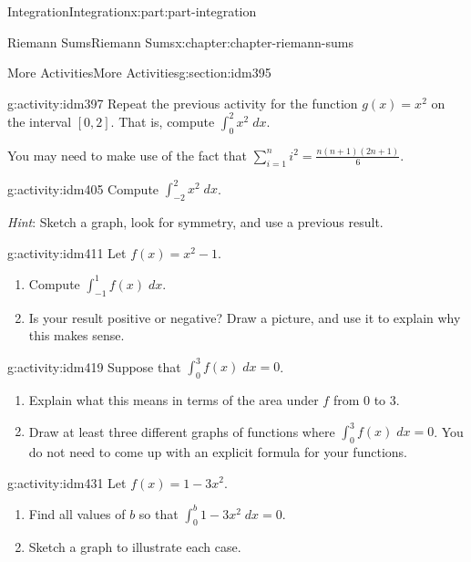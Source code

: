 \documentclass[oneside,10pt,]{book}
\numberwithin{equation}{section}
\begin{document}
\begin{partptx}{Integration}{}{Integration}{}{}{x:part:part-integration}
\begin{chapterptx}{Riemann Sums}{}{Riemann Sums}{}{}{x:chapter:chapter-riemann-sums}
%
\begin{sectionptx}{More Activities}{}{More Activities}{}{}{g:section:idm395}
\begin{activity}{}{g:activity:idm397}%
Repeat the previous activity for the function \(g(x) = x^2\) on the interval \([0,2]\). That is, compute \(\displaystyle \int_0^2 x^2 \; dx\).%
\par
You may need to make use of the fact that \(\displaystyle\sum_{i=1}^n i^2 = \frac{n(n+1)(2n+1)}{6}\).%
\end{activity}
\begin{activity}{}{g:activity:idm405}%
Compute \(\displaystyle\int_{-2}^2 x^2 \;dx\).%
\par
\emph{Hint}: Sketch a graph, look for symmetry, and use a previous result.%
\end{activity}
\begin{activity}{}{g:activity:idm411}%
Let \(f(x) = x^2 -1 \).%
\begin{enumerate}[font=\bfseries,label=(\alph*),ref=\alph*]
\item{}Compute \(\displaystyle \int_{-1}^1 f(x)\; dx\).\item{}Is your result positive or negative? Draw a picture, and use it to explain why this makes sense.%
\end{enumerate}
\end{activity}
\begin{activity}{}{g:activity:idm419}%
Suppose that \(\displaystyle \int_0^3 f(x)\;dx = 0\).%
\begin{enumerate}[font=\bfseries,label=(\alph*),ref=\alph*]
\item{}Explain what this means in terms of the area under \(f\) from \(0\) to \(3\).%
\item{}Draw at least three different graphs of functions where \(\displaystyle \int_0^3 f(x)\;dx = 0\). You do not need to come up with an explicit formula for your functions.%
\end{enumerate}
\end{activity}
\begin{activity}{}{g:activity:idm431}%
Let \(f(x) = 1-3x^2\).%
\begin{enumerate}[font=\bfseries,label=(\alph*),ref=\alph*]
\item{}Find all values of \(b\) so that \(\displaystyle\int_0^b 1-3x^2\; dx = 0\).%
\item{}Sketch a graph to illustrate each case.%
\end{enumerate}
\end{activity}

\end{sectionptx}
\end{chapterptx}
\end{partptx}
\end{document}
